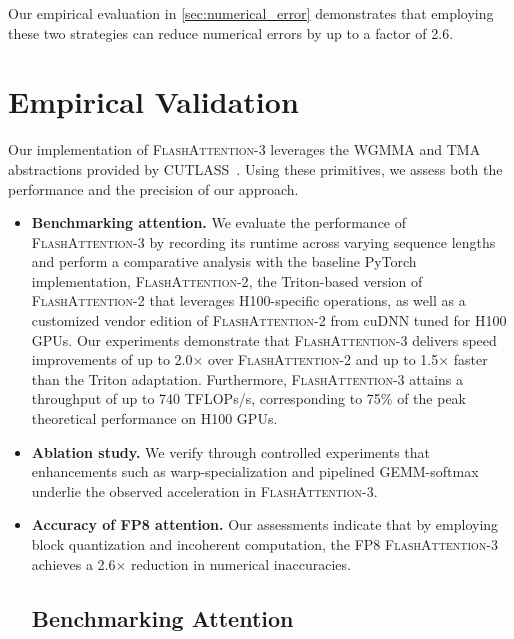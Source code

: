 \begin{enumerate}
\begin{enumerate}
\end{enumerate}

Our empirical evaluation in \cref{sec:numerical_error} demonstrates that employing these two strategies can reduce numerical errors by up to a factor of 2.6.

\section{Empirical Validation}
\label{sec:exp}

Our implementation of \textsc{FlashAttention-3} leverages the WGMMA and TMA abstractions provided by CUTLASS~\citep{Thakkar_CUTLASS_2023}. Using these primitives, we assess both the performance and the precision of our approach.

\begin{itemize}

\item \textbf{Benchmarking attention.} We evaluate the performance of \textsc{FlashAttention-3} by recording its runtime across varying sequence lengths and perform a comparative analysis with the baseline PyTorch implementation, \textsc{FlashAttention-2}, the Triton-based version of \textsc{FlashAttention-2} that leverages H100-specific operations, as well as a customized vendor edition of \textsc{FlashAttention-2} from cuDNN tuned for H100 GPUs. Our experiments demonstrate that \textsc{FlashAttention-3} delivers speed improvements of up to 2.0$\times$ over \textsc{FlashAttention-2} and up to 1.5$\times$ faster than the Triton adaptation. Furthermore, \textsc{FlashAttention-3} attains a throughput of up to 740 TFLOPs/s, corresponding to 75\% of the peak theoretical performance on H100 GPUs.
\item \textbf{Ablation study.} We verify through controlled experiments that enhancements such as warp-specialization and pipelined GEMM-softmax underlie the observed acceleration in \textsc{FlashAttention-3}.
\item \textbf{Accuracy of FP8 attention.} Our assessments indicate that by employing block quantization and incoherent computation, the FP8 \textsc{FlashAttention-3} achieves a 2.6$\times$ reduction in numerical inaccuracies.

\subsection{Benchmarking Attention}
\label{subsec:benchmark_attn}


\end{itemize}
\end{enumerate}
